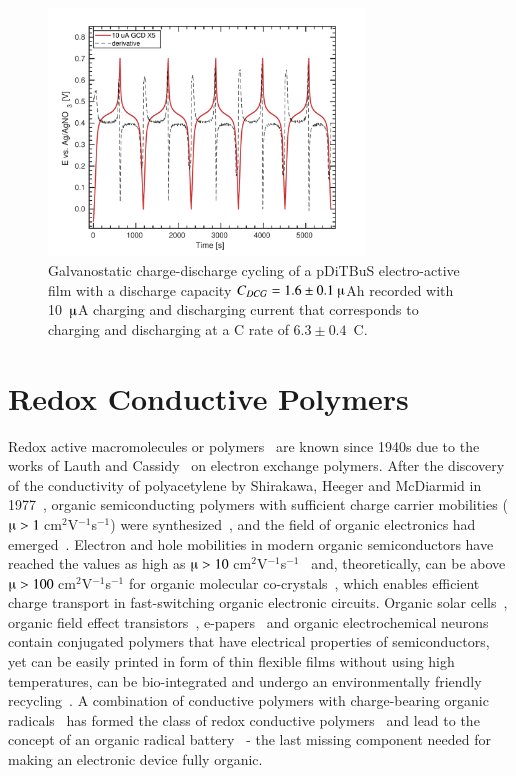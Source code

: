 \begin{figure}[h]
\center
	\includegraphics[width=0.75\textwidth]{./electrochemistry/figures/GCD_pDiTBuS.pdf}
	\caption{Galvanostatic charge-discharge cycling of a pDiTBuS electro-active film with a discharge capacity $C_{DCG}=1.6\pm0.1~\muup$Ah recorded with 10~$\muup$A charging and discharging current that corresponds to charging and discharging at a C rate of $6.3\pm0.4$~C.}
	\label{fig:GCD_DiTBuS}
\end{figure}


\section{Redox Conductive Polymers}

Redox active macromolecules or polymers~\cite{Staudinger_1920} are known since 1940s due to the works of Lauth and Cassidy~\cite{Cassidy_1949} on electron exchange polymers. After the discovery of the conductivity of polyacetylene by Shirakawa, Heeger and McDiarmid in 1977~\cite{Shirakawa_1977}, organic semiconducting polymers with sufficient charge carrier mobilities ($\muup>1~$cm$^2$V$^{-1}$s$^{-1}$) were synthesized~\cite{Hu2021}, and the field of organic electronics had emerged~\cite{heeger_polymers,Casado_2021_book}. Electron and hole mobilities in modern organic semiconductors have reached the values as high as $\muup>10~$cm$^2$V$^{-1}$s$^{-1}$~\cite{Hu2021} and, theoretically, can be above $\muup>100~$cm$^2$V$^{-1}$s$^{-1}$ for organic molecular co-crystals~\cite{Zhu2012}, which enables efficient charge transport in fast-switching organic electronic circuits. Organic solar cells~\cite{Lee_1993}, organic field effect transistors~\cite{Koezuka_1987,Yan2009}, e-papers~\cite{Hu2021} and organic electrochemical neurons~\cite{Harikesh2022} contain conjugated polymers that have electrical properties of semiconductors, yet can be easily printed in form of thin flexible films without using high temperatures, can be bio-integrated and undergo an environmentally friendly recycling~\cite{nishide_2009}. A combination of conductive polymers with charge-bearing organic radicals~\cite{IWASA2007} has formed the class of redox conductive polymers~\cite{Casado_2021_book} and lead to the concept of an organic radical battery~\cite{Rohland_2021,nishide2004_electact,nakahara2002_cpl,Xie2021} - the last missing component needed for making an electronic device fully organic.\\

